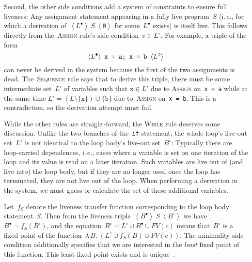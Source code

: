 \documentclass[a4paper]{easychair}
\newcommand{\liveout}[1]{\ensuremath{#1^{\circ}}}
\newcommand{\livein}[1]{\ensuremath{#1^{\bullet}}}
\newcommand{\triple}[3]{\ensuremath{
    \left\langle#1\right\rangle \ #2 \ \left\langle#3\right\rangle
}}
\def\union{\cup}
\begin{document}
Second, the other side conditions add a system of constraints to ensure full
liveness: Any assignment statement appearing in a fully live program~\(S\)
(i.\,e., for which a derivation of~\(\triple{\livein{L}}{S}{\emptyset}\) for
some~\(\livein{L}\) exists) is itself live. This follows directly from
the~\textsc{Assign} rule's side condition~\(v \in \liveout{L}\).
For example, a triple of the form
\[
\triple{\livein{L}}{\mbox{\texttt{x = a; x = b}}}{\liveout{L}}
\]
can never be derived in the system because the first of the two assignments
is dead. The~\textsc{Sequence} rule says that to derive this triple, there
must be some intermediate set~\(L'\) of variables such that \(\mathtt{x} \in
L'\) due to \textsc{Assign} on~\verb|x = a| while at the same time
\(L' = (L \setminus \{\mathtt{x}\}) \union \{\mathtt{b}\}\) due
to~\textsc{Assign} on~\verb|x = b|. This is a contradiction, so the
derivation attempt must fail.

While the other rules are straight-forward, the \textsc{While} rule deserves
some discussion. Unlike the two branches of the~\verb|if| statement, the
whole loop's live-out set~\(\liveout{L}\) is not identical to the loop
body's live-out set~\(\liveout{B}\): Typically there are loop-carried
dependences, i.\,e., cases where a variable is set on one iteration of the
loop and its value is read on a later iteration. Such variables are live out
of (and live into) the loop body, but if they are no longer used once the
loop has terminated, they are not live out of the loop. When performing a
derivation in the system, we must guess or calculate the set of these
additional variables.

Let~\(f_S\) denote the liveness transfer
function corresponding to the loop body statement~\(S\). Then from the
liveness triple~\(\triple{\livein{B}}{S}{\liveout{B}}\) we have~\(\livein{B}
= f_S(\liveout{B})\), and the equation~\(\liveout{B} = \liveout{L} \union
\livein{B} \union FV(c)\) means that~\(\liveout{B}\) is a fixed point of the
function~\(\lambda\,B.\;(\liveout{L} \union f_S(B) \union FV(c))\). The
minimality side condition additionally specifies that we are interested in
the \emph{least} fixed point of this function. This least fixed point exists
and is unique~\cite{nielson.etal-1999}.
\end{document}
